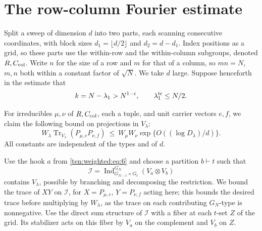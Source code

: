 \section{The row-column Fourier estimate}
\label{ten:weighted:part:157}
Split a sweep of dimension \(d\) into two parts, each scanning consecutive coordinates, with block sizes \(d_1=\lfloor d/2\rfloor\) and \(d_2=d-d_1\). Index positions as a grid, so these parts use the within-row and the within-column subgroups, denoted \(R,C_{\rm col}\). Write \(n\) for the size of a row and \(m\) for that of a column, so \(mn=N\), \(m,n\) both within a constant factor of \(\sqrt N\). We take \(d\) large. Suppose henceforth in the estimate that
\begin{equation}
 k=N-\lambda_1>N^{1-\epsilon},\qquad \lambda^{\rm tr}_1\le N/2.                            \label{ten:weighted:eq:10}
\end{equation}

For irreducibles \(\mu,\nu\) of \(R,C_{\rm col}\), each a tuple, and unit carrier vectors \(e,f\), we claim the following bound on projections in \(V_\lambda\):
\begin{equation}
 W_\lambda\operatorname{Tr}_{V_\lambda}(P_{\mu,e}P_{\nu,f})
 \ \le\ W_\mu W_\nu\exp\{O((\log D_\lambda)/d)\}.                                          \label{ten:weighted:eq:11}
\end{equation}
All constants are independent of the types and of \(d\).

Use the hook \(a\) from \eqref{ten:weighted:eq:6} and choose a partition \(b\vdash t\) such that
\[
 \mathcal I=\operatorname{Ind}_{G_{N-t}\times G_t}^{G_N}(V_a\otimes V_b)
\]
contains \(V_\lambda\), possible by branching and decomposing the restriction. We bound the trace of \(X Y\) on \(\mathcal I\), for \(X=P_{\mu,e}\), \(Y=P_{\nu,f}\) acting here; this bounds the desired trace before multiplying by \(W_\lambda\), as the trace on each contributing \(G_N\)-type is nonnegative. Use the direct sum structure of \(\mathcal I\) with a fiber at each \(t\)-set \(Z\) of the grid. Its stabilizer acts on this fiber by \(V_a\) on the complement and \(V_b\) on \(Z\).

